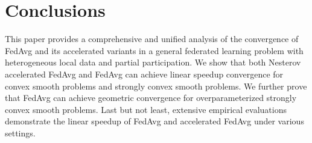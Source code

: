 
\section{Conclusions}
\begin{comment}
This paper provides a comprehensive and unified analysis of the convergence rate of FedAvg
and its accelerated variants in a general federated learning problem with heterogeneous local data and partial participation. We show that both Nesterov accelerated FedAvg and FedAvg
can achieve {\small{$\cO(\frac{1}{\sqrt{NT}})$}} linear speedup convergence for convex smooth problems and {\small{$\cO(\frac{1}{NT})$}} convergence for strongly 
convex smooth problems. In addition, we show that the local steps for stronlgy convex and convex smooth problems can be as large as {\small{$\cO(\sqrt{\frac{T}{N}})$}}, which can substantially save communication cost comparing to prior results. 
Furthermore, this work also makes algorithmic contributions. We not only prove that FedAvg can achieve exponential convergence for overparameterized strongly convex smooth problems, but also propose the MaSS accelerated Fedavg algorithm, which has provable speedup in convergence rate over FedAvg on quadratic problems. Last but not least, we empirically
verify the linear speedup of FedAvg and Nesterov accelerated FedAvg for strongly convex, convex smooth, and linear regression problems. The empirical results are well-aligned with our theories.		
\end{comment}
\vspace{-1em}
This paper provides a comprehensive and unified analysis of the convergence of FedAvg
and its accelerated variants in a general federated learning problem with heterogeneous local data and partial participation. 
We show that both Nesterov accelerated FedAvg and FedAvg can achieve linear speedup convergence for convex smooth problems and strongly 
convex smooth problems. We further prove that FedAvg can achieve geometric convergence for overparameterized strongly convex smooth problems. Last but not least, extensive empirical 
evaluations demonstrate the linear speedup of FedAvg and accelerated FedAvg under various settings.	

